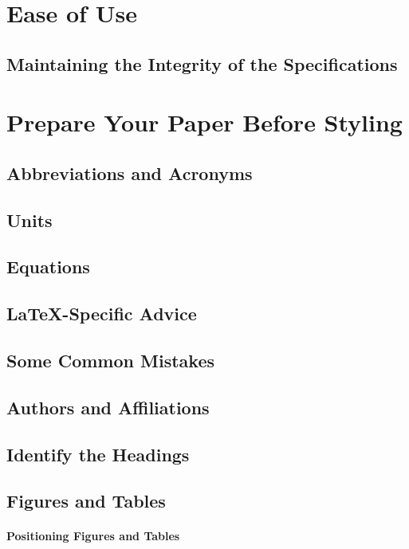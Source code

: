 \documentclass[conference]{IEEEtran}
\begin{document}
\section{Ease of Use}

\subsection{Maintaining the Integrity of the Specifications}

\section{Prepare Your Paper Before Styling}

\subsection{Abbreviations and Acronyms}

\subsection{Units}


\subsection{Equations}

\subsection{\LaTeX-Specific Advice}


\subsection{Some Common Mistakes}
\cite{Cole2013}
\cite{NIST2011}
\cite{Statista2023}
\subsection{Authors and Affiliations}


\subsection{Identify the Headings}

\subsection{Figures and Tables}
\paragraph{Positioning Figures and Tables}
\end{document}
